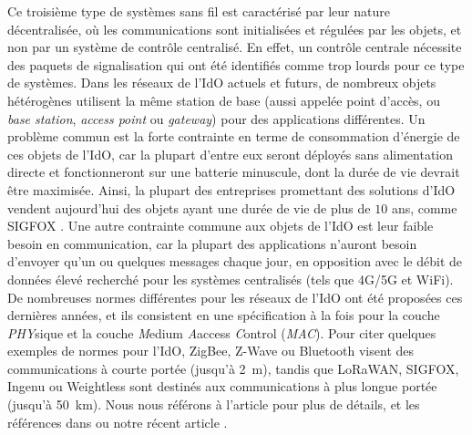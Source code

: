 \begin{resume_fr}
Ce troisième type de systèmes sans fil est caractérisé par leur nature décentralisée,
où les communications sont initialisées et régulées par les objets, et non par un système de contrôle centralisé.
%
En effet, un contrôle centrale nécessite des paquets de signalisation qui ont été identifiés comme trop lourds pour ce type de systèmes.
Dans les réseaux de l'IdO actuels et futurs, de nombreux objets hétérogènes utilisent la même station de base (aussi appelée point d'accès, ou \emph{base station}, \emph{access point} ou \emph{gateway}) pour des applications différentes.
Un problème commun est la forte contrainte en terme de consommation d'énergie de ces objets de l'IdO, car la plupart d'entre eux seront déployés sans alimentation directe et fonctionneront sur une batterie minuscule, dont la durée de vie devrait être maximisée.
Ainsi, la plupart des entreprises promettant des solutions d'IdO vendent aujourd'hui des objets ayant une durée de vie de plus de $10$ ans, comme SIGFOX \cite{Centenaro16}.
Une autre contrainte commune aux objets de l'IdO est leur faible besoin en communication, car la plupart des applications n'auront besoin d'envoyer qu'un ou quelques messages chaque jour, en opposition avec le débit de données élevé recherché pour les systèmes centralisés (tels que 4G/5G et WiFi).
%
De nombreuses normes différentes pour les réseaux de l'IdO ont été proposées ces dernières années,
et ils consistent en une spécification à la fois pour la couche \emph{PHY}sique
et la couche \emph{M}edium \emph{A}access \emph{C}ontrol (\emph{MAC}).
Pour citer quelques exemples de normes pour l'IdO, ZigBee, Z-Wave ou Bluetooth visent des communications à courte portée (jusqu'à \SI{2}{\meter}), tandis que LoRaWAN, SIGFOX, Ingenu ou Weightless sont destinés aux communications à plus longue portée (jusqu'à \SI{50}{\kilo\meter}).
Nous nous référons à l'article \cite{Centenaro16} pour plus de détails, et les références dans \cite{Azari18} ou notre récent article \cite{MoyBesson2019}.



\end{resume_fr}
